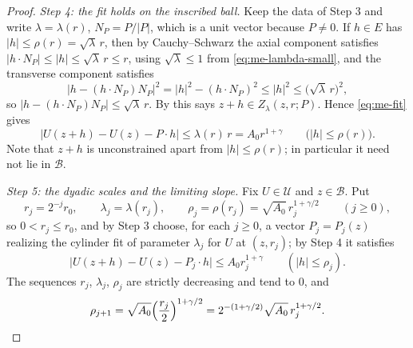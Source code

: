 \begin{proof}
\emph{Step 4: the fit holds on the inscribed ball.}
Keep the data of Step 3 and write $\lambda=\lambda(r)$, $N_P=P/|P|$, which is a
unit vector because $P\ne0$. If $h\in E$ has $|h|\le\rho(r)=\sqrt\lambda\,r$,
then by Cauchy--Schwarz the axial component satisfies
$|h\cdot N_P|\le|h|\le\sqrt\lambda\,r\le r$, using $\sqrt\lambda\le1$ from
\eqref{eq:me-lambda-small}, and the transverse component satisfies
\[
  \bigl|h-(h\cdot N_P)N_P\bigr|^2=|h|^2-(h\cdot N_P)^2\le|h|^2
   \le\bigl(\sqrt\lambda\,r\bigr)^2 ,
\]
so $|h-(h\cdot N_P)N_P|\le\sqrt\lambda\,r$. By  this says
$z+h\in Z_\lambda(z,r;P)$. Hence \eqref{eq:me-fit} gives
\begin{equation}\label{eq:me-ball-fit}
  \bigl|U(z+h)-U(z)-P\cdot h\bigr|\le\lambda(r)\,r=A_0r^{1+\gamma}
  \qquad\bigl(|h|\le\rho(r)\bigr).
\end{equation}
Note that $z+h$ is unconstrained apart from $|h|\le\rho(r)$; in particular it
need not lie in $\mathcal B$.

\emph{Step 5: the dyadic scales and the limiting slope.}
Fix $U\in\mathcal U$ and $z\in\mathcal B$. Put
\[
  r_j=2^{-j}r_0,\qquad \lambda_j=\lambda(r_j),\qquad
  \rho_j=\rho(r_j)=\sqrt{A_0}\,r_j^{1+\gamma/2}\qquad(j\ge0),
\]
so $0<r_j\le r_0$, and by Step 3 choose, for each $j\ge0$, a vector $P_j=P_j(z)$
realizing the cylinder fit of parameter $\lambda_j$ for $U$ at $(z,r_j)$; by
Step 4 it satisfies
\begin{equation}\label{eq:me-fit-j}
  \bigl|U(z+h)-U(z)-P_j\cdot h\bigr|\le A_0r_j^{1+\gamma}
  \qquad(|h|\le\rho_j).
\end{equation}
The sequences $r_j$, $\lambda_j$, $\rho_j$ are strictly decreasing and tend to
$0$, and
\begin{equation}\label{eq:me-rho-recursion}
  \rho_{j+1}=\sqrt{A_0}\Bigl(\frac{r_j}{2}\Bigr)^{1+\gamma/2}
   =2^{-(1+\gamma/2)}\sqrt{A_0}\,r_j^{1+\gamma/2}.
\end{equation}


\end{proof}
